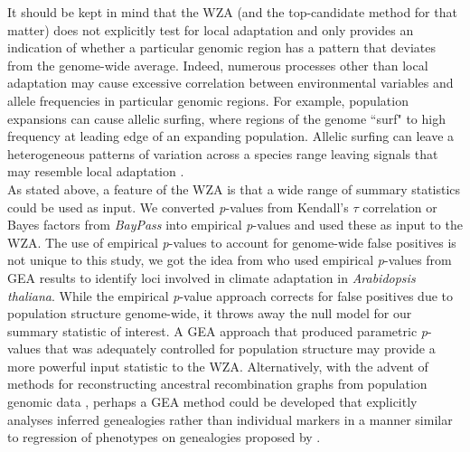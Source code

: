\documentclass[10pt,twoside,lineno, twocolumn]{GSA_format}
\begin{document}
It should be kept in mind that the WZA (and the top-candidate method for that matter) does not explicitly test for local adaptation and only provides an indication of whether a particular genomic region has a pattern that deviates from the genome-wide average. Indeed, numerous processes other than local adaptation may cause excessive correlation between environmental variables and allele frequencies in particular genomic regions. For example, population expansions can cause allelic surfing, where regions of the genome ``surf" to high frequency at leading edge of an expanding population. Allelic surfing can leave a heterogeneous patterns of variation across a species range leaving signals that may resemble local adaptation \citep{Novembre2009, Klopfstein2006}.  \\

As stated above, a feature of the WZA is that a wide range of summary statistics could be used as input. We converted \textit{p}-values from Kendall's $\tau$ correlation or Bayes factors from \textit{BayPass} into empirical \textit{p}-values and used these as input to the WZA. The use of empirical \textit{p}-values to account for genome-wide false positives is not unique to this study, we got the idea from \cite{Hancock2011} who used empirical \textit{p}-values from GEA results to identify loci involved in climate adaptation in \textit{Arabidopsis thaliana}. While the empirical \textit{p}-value approach corrects for false positives due to population structure genome-wide, it throws away the null model for our summary statistic of interest. A GEA approach that produced parametric \textit{p}-values that was adequately controlled for population structure may provide a more powerful input statistic to the WZA. Alternatively, with the advent of methods for reconstructing ancestral recombination graphs from population genomic data \citep{Hejase2020}, perhaps a GEA method could be developed that explicitly analyses inferred genealogies rather than individual markers in a manner similar to regression of phenotypes on genealogies proposed by \cite{Ralph2020}. \\



\end{document}
